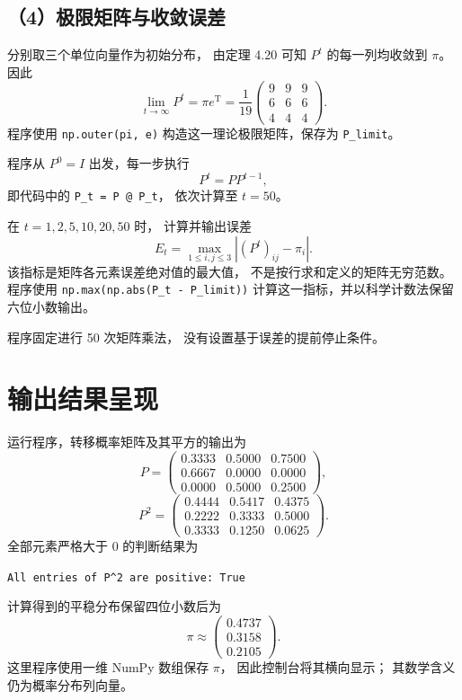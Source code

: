 \documentclass[UTF8,a4paper,11pt,fontset=fandol]{ctexart}
\begin{document}
\subsection*{（4）极限矩阵与收敛误差}

分别取三个单位向量作为初始分布，
由定理 4.20 可知 $P^t$ 的每一列均收敛到 $\pi$。
因此
\[
\lim_{t\to\infty}P^t
=\pi e^{\mathrm T}
=\frac1{19}
\begin{pmatrix}
9&9&9\\
6&6&6\\
4&4&4
\end{pmatrix}.
\]
程序使用 \texttt{np.outer(pi, e)}
构造这一理论极限矩阵，保存为 \texttt{P\_limit}。

程序从 $P^0=I$ 出发，每一步执行
\[
P^{t}=P P^{t-1},
\]
即代码中的 \texttt{P\_t = P @ P\_t}，
依次计算至 $t=50$。

在 $t=1,2,5,10,20,50$ 时，
计算并输出误差
\[
E_t=
\max_{1\leq i,j\leq3}
\left|(P^t)_{ij}-\pi_i\right|.
\]
该指标是矩阵各元素误差绝对值的最大值，
不是按行求和定义的矩阵无穷范数。
程序使用
\texttt{np.max(np.abs(P\_t - P\_limit))}
计算这一指标，并以科学计数法保留六位小数输出。

程序固定进行 50 次矩阵乘法，
没有设置基于误差的提前停止条件。

\section{输出结果呈现}

运行程序，转移概率矩阵及其平方的输出为
\[
P=
\begin{pmatrix}
0.3333&0.5000&0.7500\\
0.6667&0.0000&0.0000\\
0.0000&0.5000&0.2500
\end{pmatrix},
\]
\[
P^2=
\begin{pmatrix}
0.4444&0.5417&0.4375\\
0.2222&0.3333&0.5000\\
0.3333&0.1250&0.0625
\end{pmatrix}.
\]
全部元素严格大于 0 的判断结果为
\begin{center}
\texttt{All entries of P\^{}2 are positive: True}
\end{center}

计算得到的平稳分布保留四位小数后为
\[
\pi\approx
\begin{pmatrix}
0.4737\\
0.3158\\
0.2105
\end{pmatrix}.
\]
这里程序使用一维 NumPy 数组保存 $\pi$，
因此控制台将其横向显示；
其数学含义仍为概率分布列向量。
\end{document}
